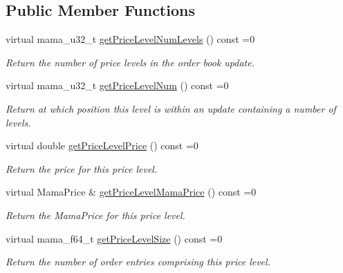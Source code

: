 \subsection*{Public Member Functions}
\begin{CompactItemize}
\item 
virtual mama\_\-u32\_\-t \hyperlink{classWombat_1_1MamdaBookAtomicLevel_9b93f1c575fa54e72ce1da2d81034bb7}{get\-Price\-Level\-Num\-Levels} () const =0
\begin{CompactList}\small\item\em Return the number of price levels in the order book update. \item\end{CompactList}\item 
virtual mama\_\-u32\_\-t \hyperlink{classWombat_1_1MamdaBookAtomicLevel_9805eb2f6cd0313e9923070c2f50bf1a}{get\-Price\-Level\-Num} () const =0
\begin{CompactList}\small\item\em Return at which position this level is within an update containing a number of levels. \item\end{CompactList}\item 
virtual double \hyperlink{classWombat_1_1MamdaBookAtomicLevel_5bcc378cd2085048f8fa1870265e5ce0}{get\-Price\-Level\-Price} () const =0
\begin{CompactList}\small\item\em Return the price for this price level. \item\end{CompactList}\item 
virtual Mama\-Price \& \hyperlink{classWombat_1_1MamdaBookAtomicLevel_e250b6d0ba73f1396a7ac16a18564fc7}{get\-Price\-Level\-Mama\-Price} () const =0
\begin{CompactList}\small\item\em Return the Mama\-Price for this price level. \item\end{CompactList}\item 
virtual mama\_\-f64\_\-t \hyperlink{classWombat_1_1MamdaBookAtomicLevel_bf9d9609a53a7344d6232ba70407d069}{get\-Price\-Level\-Size} () const =0
\begin{CompactList}\small\item\em Return the number of order entries comprising this price level. \item\end{CompactList}\item 

\end{CompactItemize}
